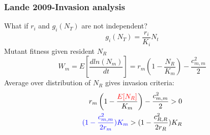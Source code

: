 \documentclass{beamer}
\begin{document}

\begin{frame}
\frametitle{Lande 2009-Invasion analysis}
What if \(r_i\) and \(g_i(N_T)\) are not independent?
\begin{equation*}
g_i(N_T)=\frac{r_i}{K_i}N_t
\end{equation*}
Mutant fitness given resident \(N_R\)
\begin{equation*}
W_m=E[\frac{dln(N_m)}{dt}]=r_m\left(1-\frac{N_R}{K_m}\right)-\frac{c_{m,m}^2}{2}
\end{equation*}
Average over distribution of \(N_R\) gives invasion criteria:
\begin{equation*}
\begin{aligned}
r_m\left(1-\frac{\begingroup\color{red}E[N_R]\endgroup}{K_m}\right)-\frac{c_{m,m}^2}{2} > 0 \\
\begingroup\color{blue}(1-\frac{c_{m,m}^2}{2r_m})K_m\endgroup > (1-\frac{c_{R,R}^2}{2r_R})K_R
\end{aligned}
\end{equation*}
\end{frame}
\end{document}
